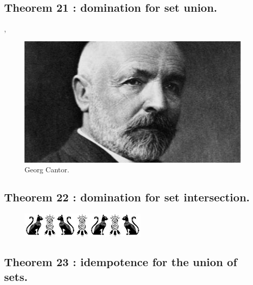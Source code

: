\documentclass[preview]{standalone}
\begin{document}
\subsection[Domination for set union.]
    {
        \color{section}Theorem 21 \color{black} : domination for set union.
    }

\sep
\begin{figure}[!h]
    \centering
    \includegraphics[width=13.75cm]{../resources/jpg/2.2.set.operations/georg_cantor.jpg}
    \caption*{Georg Cantor.}
\end{figure}
\pagebreak


\subsection[Domination for set intersection.]
    {
        \color{section}Theorem 22 \color{black} : domination for set intersection.
    }

\vspace{3\baselineskip}
\begin{figure}[!h]
    \centering
    \includegraphics[width=6cm]{../resources/jpg/2.2.set.operations/border1.jpg}
\end{figure}
\vspace{2\baselineskip}


\subsection[Idempotence for the union of sets.]
    {
        \color{section}Theorem 23 \color{black} : idempotence for the union of sets.
    }

\pagebreak
\end{document}
